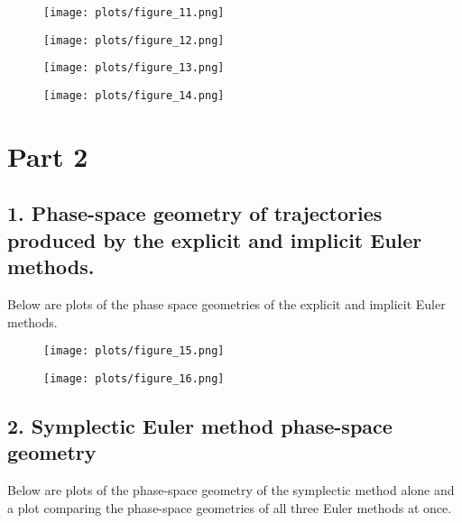 \documentclass{article}
\begin{document}
\begin{figure}[H]
\centering
\texttt{[image: plots/figure\_11.png]}
\end{figure}

\begin{figure}[H]
\centering
\texttt{[image: plots/figure\_12.png]}
\end{figure}

\begin{figure}[H]
\centering
\texttt{[image: plots/figure\_13.png]}
\end{figure}

\begin{figure}[H]
\centering
\texttt{[image: plots/figure\_14.png]}
\end{figure}

\section*{Part 2}

\subsection*{1. Phase-space geometry of trajectories produced by the explicit and implicit Euler methods.}
Below are plots of the phase space geometries of the explicit and implicit Euler methods.

\begin{figure}[H]
\centering
\texttt{[image: plots/figure\_15.png]}
\end{figure}

\begin{figure}[H]
\centering
\texttt{[image: plots/figure\_16.png]}
\end{figure}

\subsection*{2. Symplectic Euler method phase-space geometry}
Below are plots of the phase-space geometry of the symplectic method alone and a plot comparing the phase-space geometries of all three Euler methods at once.
\end{document}

